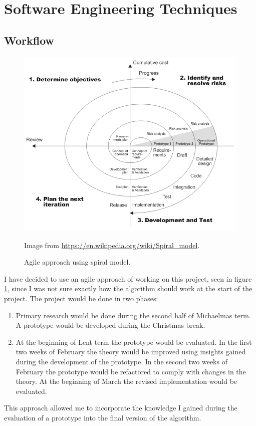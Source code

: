 \documentclass[12pt,a4paper]{book}
\newcommand\note[1]{\vspace*{-0.5\baselineskip}\caption*{#1}}
\begin{document}
\section{Software Engineering Techniques}
\subsection{Workflow}
\begin{figure}[ht]
\centering
\includegraphics[scale=0.5]{spiral-model}
\caption{Agile approach using spiral model.}
\note{Image from \url{https://en.wikipedia.org/wiki/Spiral_model}.}
\label{fig:spiral-model}
\end{figure}
I have decided to use an agile approach of working on this project, seen in figure \ref{fig:spiral-model}, since I was not sure exactly how the algorithm should work at the start of the project.
The project would be done in two phases:
\begin{enumerate}
\item Primary research would be done during the second half of Michaelmas term.
A prototype would be developed during the Christmas break.
\item At the beginning of Lent term the prototype would be evaluated.
In the first two weeks of February the theory would be improved using insights gained during the development of the prototype.
In the second two weeks of February the prototype would be refactored to comply with changes in the theory.
At the beginning of March the revised implementation would be evaluated.
\end{enumerate}
This approach allowed me to incorporate the knowledge I gained during the evaluation of a prototype into the final version of the algorithm.
\end{document}
